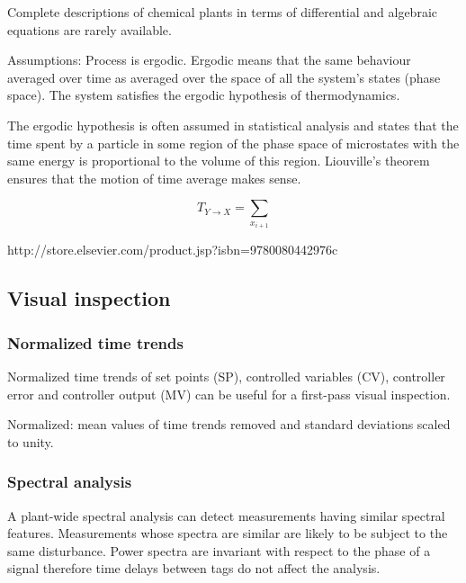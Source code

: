 Complete descriptions of chemical plants in terms of differential and algebraic equations are rarely available.


Assumptions:
Process is ergodic.
Ergodic means that the same behaviour averaged over time as averaged over the space of all the system's states (phase space).
The system satisfies the ergodic hypothesis of thermodynamics.

The ergodic hypothesis is often assumed in statistical analysis and states that the time spent by a particle in some region of the phase space of microstates with the same energy is proportional to the volume of this region.
Liouville's theorem ensures that the motion of time average makes sense.

\begin{equation}
  T_{Y\rightarrow X} = \sum_{x_{i+1}}
\end{equation}



http://store.elsevier.com/product.jsp?isbn=9780080442976c







\subsection{Visual inspection}

\subsubsection{Normalized time trends}

Normalized time trends of set points (SP), controlled variables (CV), controller error and controller output (MV) can be useful for a first-pass visual inspection.

Normalized: mean values of time trends removed and standard deviations scaled to unity.

\subsubsection{Spectral analysis}

A plant-wide spectral analysis can detect measurements having similar spectral features.
Measurements whose spectra are similar are likely to be subject to the same disturbance.
Power spectra are invariant with respect to the phase of a signal therefore time delays between tags do not affect the analysis.

